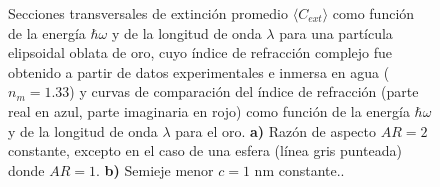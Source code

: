 \begin{figure}[H]
	\quad%
	\caption{Secciones transversales de extinción promedio $\langle C_{ext}\rangle$ como función de la energía $\hbar\omega$ y de la longitud de onda $\lambda$ para una partícula elipsoidal oblata de oro, cuyo índice de refracción complejo fue obtenido a partir de datos experimentales  e inmersa en agua ($n_m=1.33$) y curvas de comparación del índice de refracción (parte real en azul, parte imaginaria en rojo) como función de la energía $\hbar\omega$ y de la longitud de onda $\lambda$ para el oro. \textbf{a)} Razón de aspecto $AR=2$ constante, excepto en el caso de una esfera (línea gris punteada) donde $AR=1$. \textbf{b)} Semieje menor $c=1$ nm constante..}\label{oro}
\end{figure}


